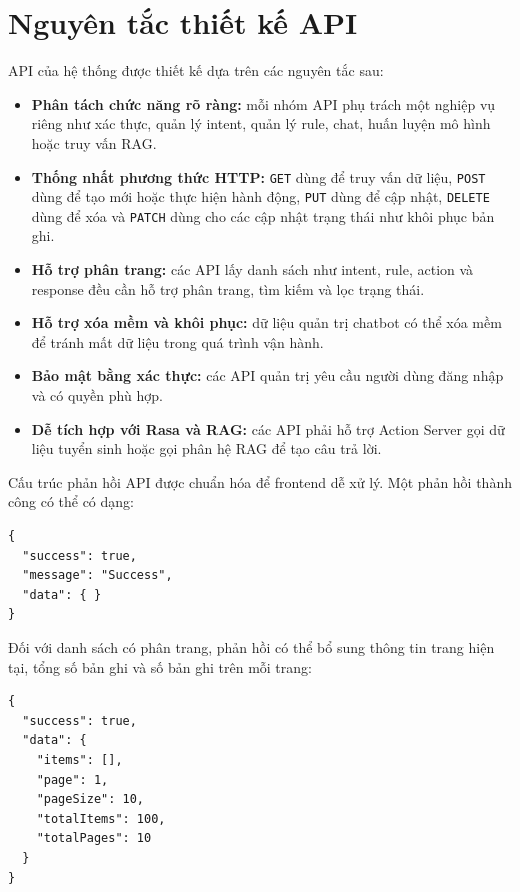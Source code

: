\section{Nguyên tắc thiết kế API}

API của hệ thống được thiết kế dựa trên các nguyên tắc sau:

\begin{itemize}
    \item \textbf{Phân tách chức năng rõ ràng:} mỗi nhóm API phụ trách một nghiệp vụ riêng như xác thực, quản lý intent, quản lý rule, chat, huấn luyện mô hình hoặc truy vấn RAG.
    \item \textbf{Thống nhất phương thức HTTP:} \texttt{GET} dùng để truy vấn dữ liệu, \texttt{POST} dùng để tạo mới hoặc thực hiện hành động, \texttt{PUT} dùng để cập nhật, \texttt{DELETE} dùng để xóa và \texttt{PATCH} dùng cho các cập nhật trạng thái như khôi phục bản ghi.
    \item \textbf{Hỗ trợ phân trang:} các API lấy danh sách như intent, rule, action và response đều cần hỗ trợ phân trang, tìm kiếm và lọc trạng thái.
    \item \textbf{Hỗ trợ xóa mềm và khôi phục:} dữ liệu quản trị chatbot có thể xóa mềm để tránh mất dữ liệu trong quá trình vận hành.
    \item \textbf{Bảo mật bằng xác thực:} các API quản trị yêu cầu người dùng đăng nhập và có quyền phù hợp.
    \item \textbf{Dễ tích hợp với Rasa và RAG:} các API phải hỗ trợ Action Server gọi dữ liệu tuyển sinh hoặc gọi phân hệ RAG để tạo câu trả lời.
\end{itemize}

Cấu trúc phản hồi API được chuẩn hóa để frontend dễ xử lý. Một phản hồi thành công có thể có dạng:

\begin{verbatim}
{
  "success": true,
  "message": "Success",
  "data": { }
}
\end{verbatim}

Đối với danh sách có phân trang, phản hồi có thể bổ sung thông tin trang hiện tại, tổng số bản ghi và số bản ghi trên mỗi trang:

\begin{verbatim}
{
  "success": true,
  "data": {
    "items": [],
    "page": 1,
    "pageSize": 10,
    "totalItems": 100,
    "totalPages": 10
  }
}
\end{verbatim}
